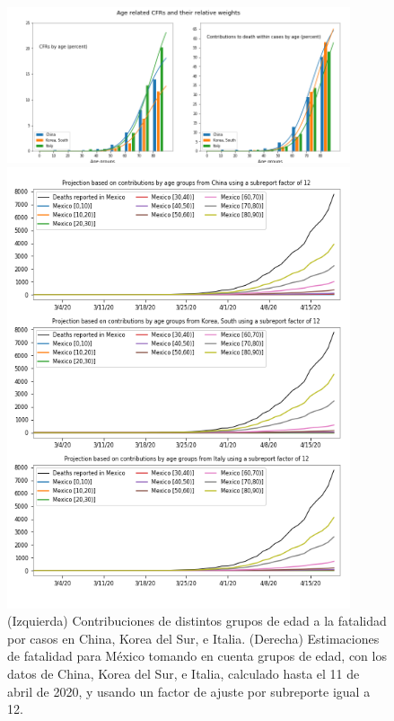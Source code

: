 \begin{figure}[h]
\centering
\begin{minipage}{0.5\textwidth}
\includegraphics[width=0.9\textwidth]{../tsam_Covid19_analysis/figures/tsam_Covid19_JHU_cfr+propDeathCases_ByAge_China+SKorea+Italy_OneFigure.png}
\end{minipage}%
\begin{minipage}{0.5\textwidth}
\includegraphics[width=0.9\textwidth] {../tsam_Covid19_analysis/figures/tsam_Covid19_JHU_cfr+propDeathCasesByAgeTS_EstimatesMexico_subReportFactor12.png}
\end{minipage}
\caption{(Izquierda) Contribuciones de distintos grupos de edad a la fatalidad por casos en China, Korea del Sur, e Italia. (Derecha) Estimaciones de fatalidad para México tomando en cuenta grupos de edad, con los datos de China, Korea del Sur, e Italia, calculado hasta el 11 de abril de 2020, y usando un factor de ajuste por subreporte igual a 12. }\label{fig:estimates}
\end{figure}

